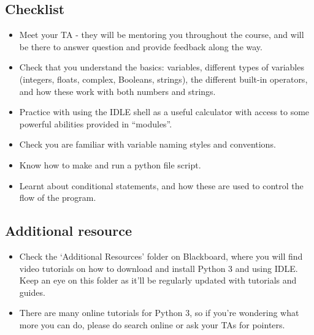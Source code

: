 \documentclass[11pt]{report}
\begin{document}
\subsection*{Checklist}
\begin{itemize}
    \item Meet your TA - they will be mentoring you throughout the course, and will be there to answer question and provide feedback along the way.
	\item Check that you understand the basics: variables, different types of variables (integers, floats, complex, Booleans, strings), the different built-in operators, and how these work with both numbers and strings.
	\item Practice with using the IDLE shell as a useful calculator with access to some powerful abilities provided in ``modules''.
    \item Check you are familiar with variable naming styles and conventions.
    \item Know how to make and run a python file script.
	\item Learnt about conditional statements, and how these are used to control the flow of the program.
\end{itemize}

\subsection*{Additional resource}
\begin{itemize}
    \item Check the `Additional Resources' folder on Blackboard, where you will find video tutorials on how to download and install Python 3 and using IDLE. Keep an eye on this folder as it'll be regularly updated with tutorials and guides.
	\item There are many online tutorials for Python 3, so if you're wondering what more you can do, please do search online or ask your TAs for pointers.
\end{itemize}
\end{document}
